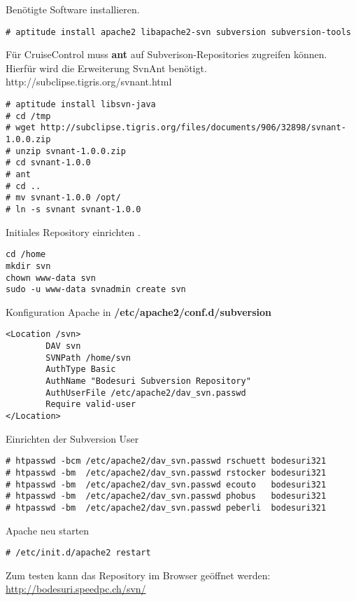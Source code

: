 \documentclass[a4paper,12pt,halfparskip,DIV14]{scrreprt}
\begin{document}
Benötigte Software installieren.

\begin{verbatim}
# aptitude install apache2 libapache2-svn subversion subversion-tools
\end{verbatim}

Für CruiseControl muss \textbf{ant} auf Subverison-Repositories zugreifen können. Hierfür wird die Erweiterung SvnAnt benötigt. http://subclipse.tigris.org/svnant.html

\begin{verbatim}
# aptitude install libsvn-java
# cd /tmp
# wget http://subclipse.tigris.org/files/documents/906/32898/svnant-1.0.0.zip
# unzip svnant-1.0.0.zip
# cd svnant-1.0.0
# ant
# cd ..
# mv svnant-1.0.0 /opt/
# ln -s svnant svnant-1.0.0
\end{verbatim}

Initiales Repository einrichten .

\begin{verbatim}
cd /home
mkdir svn
chown www-data svn
sudo -u www-data svnadmin create svn
\end{verbatim}

Konfiguration Apache in \textbf{/etc/apache2/conf.d/subversion}

\begin{verbatim}
<Location /svn>
        DAV svn
        SVNPath /home/svn
        AuthType Basic
        AuthName "Bodesuri Subversion Repository"
        AuthUserFile /etc/apache2/dav_svn.passwd
        Require valid-user
</Location>
\end{verbatim}

Einrichten der Subversion User

\begin{verbatim}
# htpasswd -bcm /etc/apache2/dav_svn.passwd rschuett bodesuri321
# htpasswd -bm  /etc/apache2/dav_svn.passwd rstocker bodesuri321
# htpasswd -bm  /etc/apache2/dav_svn.passwd ecouto   bodesuri321
# htpasswd -bm  /etc/apache2/dav_svn.passwd phobus   bodesuri321
# htpasswd -bm  /etc/apache2/dav_svn.passwd peberli  bodesuri321
\end{verbatim}

Apache neu starten

\begin{verbatim}
# /etc/init.d/apache2 restart
\end{verbatim}

Zum testen kann das Repository im Browser geöffnet werden: \url{http://bodesuri.speedpc.ch/svn/} 

\end{document}
